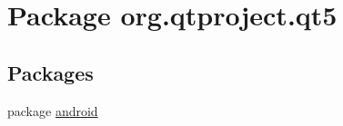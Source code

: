 \hypertarget{namespaceorg_1_1qtproject_1_1qt5}{\section{Package org.\+qtproject.\+qt5}
\label{namespaceorg_1_1qtproject_1_1qt5}
}
\subsection*{Packages}
\begin{DoxyCompactItemize}
\item 
package \hyperlink{namespaceorg_1_1qtproject_1_1qt5_1_1android}{android}
\end{DoxyCompactItemize}
